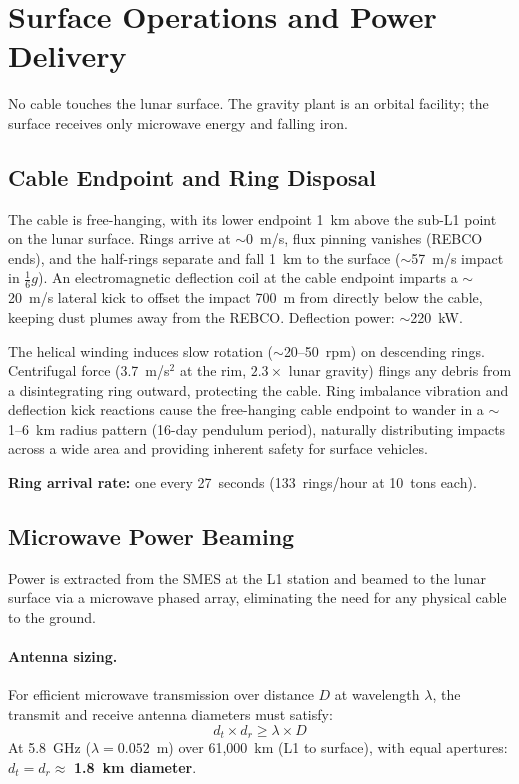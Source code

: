 \section{Surface Operations and Power Delivery}

No cable touches the lunar surface. The gravity plant is an orbital facility; the surface receives only microwave energy and falling iron.

\subsection{Cable Endpoint and Ring Disposal}

The cable is free-hanging, with its lower endpoint 1~km above the sub-L1 point on the lunar surface. Rings arrive at ${\sim}$0~m/s, flux pinning vanishes (REBCO ends), and the half-rings separate and fall 1~km to the surface (${\sim}$57~m/s impact in $\frac{1}{6}g$). An electromagnetic deflection coil at the cable endpoint imparts a ${\sim}$20~m/s lateral kick to offset the impact 700~m from directly below the cable, keeping dust plumes away from the REBCO\@. Deflection power: ${\sim}$220~kW.

The helical winding induces slow rotation (${\sim}$20--50~rpm) on descending rings. Centrifugal force (3.7~m/s$^2$ at the rim, $2.3\times$ lunar gravity) flings any debris from a disintegrating ring outward, protecting the cable. Ring imbalance vibration and deflection kick reactions cause the free-hanging cable endpoint to wander in a ${\sim}$1--6~km radius pattern (16-day pendulum period), naturally distributing impacts across a wide area and providing inherent safety for surface vehicles.

\textbf{Ring arrival rate:} one every 27~seconds (133~rings/hour at 10~tons each).

\subsection{Microwave Power Beaming}\label{sec:microwave}

Power is extracted from the SMES at the L1 station and beamed to the lunar surface via a microwave phased array, eliminating the need for any physical cable to the ground.

\paragraph{Antenna sizing.}
For efficient microwave transmission over distance $D$ at wavelength $\lambda$, the transmit and receive antenna diameters must satisfy:
\begin{equation}
d_t \times d_r \geq \lambda \times D
\end{equation}
At 5.8~GHz ($\lambda = 0.052$~m) over 61{,}000~km (L1 to surface), with equal apertures: $d_t = d_r \approx$ \textbf{1.8~km diameter}.

